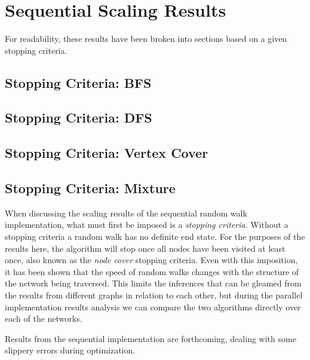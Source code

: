 \section{Sequential Scaling Results}\label{sec:sequential-scaling-\myInitials}


For readability, these results have been broken into sections based on a given stopping criteria.

\subsection{Stopping Criteria: BFS}
\subsection{Stopping Criteria: DFS}
\subsection{Stopping Criteria: Vertex Cover}
\subsection{Stopping Criteria: Mixture}

When discussing the scaling results of the sequential random walk implementation, what must first be imposed is a \textit{stopping criteria}. Without a stopping criteria a random walk has no definite end state. For the purposes of the results here, the algorithm will stop once all nodes have been visited at least once, also known as the \textit{node cover} stopping criteria. Even with this imposition, it has been shown that the speed of random walks changes with the structure of the network being traversed\cite{Virág99onthe}. This limits the inferences that can be gleamed from the results from different graphs in relation to each other, but during the parallel implementation results analysis we can compare the two algorithms directly over each of the networks.

Results from the sequential implementation are forthcoming, dealing with some slippery errors during optimization.